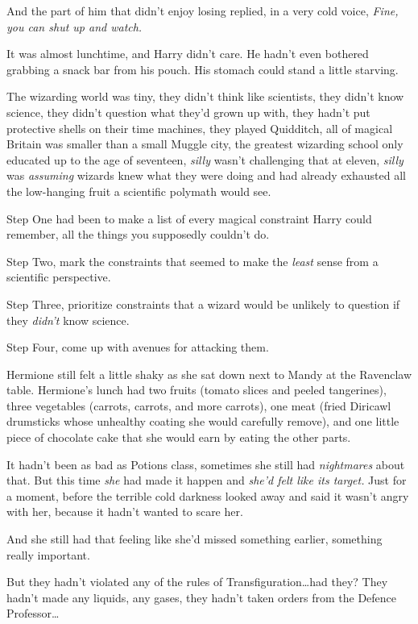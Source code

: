 And the part of him that didn’t enjoy losing replied, in a very cold voice, \emph{Fine, you can shut up and watch.}

\later

It was almost lunchtime, and Harry didn’t care. He hadn’t even bothered grabbing a snack bar from his pouch. His stomach could stand a little starving.

The wizarding world was tiny, they didn’t think like scientists, they didn’t know science, they didn’t question what they’d grown up with, they hadn’t put protective shells on their time machines, they played Quidditch, all of magical Britain was smaller than a small Muggle city, the greatest wizarding school only educated up to the age of seventeen, \emph{silly} wasn’t challenging that at eleven, \emph{silly} was \emph{assuming} wizards knew what they were doing and had already exhausted all the low-hanging fruit a scientific polymath would see.

Step One had been to make a list of every magical constraint Harry could remember, all the things you supposedly couldn’t do.

Step Two, mark the constraints that seemed to make the \emph{least} sense from a scientific perspective.

Step Three, prioritize constraints that a wizard would be unlikely to question if they \emph{didn’t} know science.

Step Four, come up with avenues for attacking them.

\later

Hermione still felt a little shaky as she sat down next to Mandy at the Ravenclaw table. Hermione’s lunch had two fruits (tomato slices and peeled tangerines), three vegetables (carrots, carrots, and more carrots), one meat (fried Diricawl drumsticks whose unhealthy coating she would carefully remove), and one little piece of chocolate cake that she would earn by eating the other parts.

It hadn’t been as bad as Potions class, sometimes she still had \emph{nightmares} about that. But this time \emph{she} had made it happen and \emph{she’d felt like its target.} Just for a moment, before the terrible cold darkness looked away and said it wasn’t angry with her, because it hadn’t wanted to scare her.

And she still had that feeling like she’d missed something earlier, something really important.

But they hadn’t violated any of the rules of Transfiguration…had they? They hadn’t made any liquids, any gases, they hadn’t taken orders from the Defence Professor…

